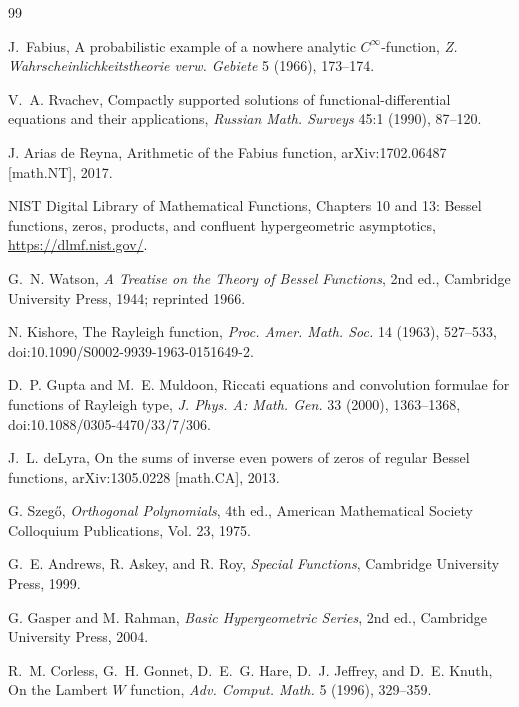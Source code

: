 \documentclass[11pt]{article}
\theoremstyle{definition}
\theoremstyle{remark}
\begin{document}
\begin{thebibliography}{99}

J.~Fabius,
\newblock A probabilistic example of a nowhere analytic \(C^\infty\)-function,
\newblock \emph{Z. Wahrscheinlichkeitstheorie verw. Gebiete} 5 (1966),
173--174.

V.~A. Rvachev,
\newblock Compactly supported solutions of functional-differential equations
and their applications,
\newblock \emph{Russian Math. Surveys} 45:1 (1990), 87--120.

J. Arias de Reyna,
\newblock Arithmetic of the Fabius function,
\newblock arXiv:1702.06487 [math.NT], 2017.

NIST Digital Library of Mathematical Functions,
\newblock Chapters 10 and 13: Bessel functions, zeros, products, and confluent
hypergeometric asymptotics,
\newblock \url{https://dlmf.nist.gov/}.

G.~N. Watson,
\newblock \emph{A Treatise on the Theory of Bessel Functions}, 2nd ed.,
\newblock Cambridge University Press, 1944; reprinted 1966.

N. Kishore,
\newblock The Rayleigh function,
\newblock \emph{Proc. Amer. Math. Soc.} 14 (1963), 527--533,
\newblock doi:10.1090/S0002-9939-1963-0151649-2.

D.~P. Gupta and M.~E. Muldoon,
\newblock Riccati equations and convolution formulae for functions of
Rayleigh type,
\newblock \emph{J. Phys. A: Math. Gen.} 33 (2000), 1363--1368,
\newblock doi:10.1088/0305-4470/33/7/306.

J.~L. deLyra,
\newblock On the sums of inverse even powers of zeros of regular Bessel
functions,
\newblock arXiv:1305.0228 [math.CA], 2013.

G. Szeg\H{o},
\newblock \emph{Orthogonal Polynomials}, 4th ed.,
\newblock American Mathematical Society Colloquium Publications, Vol. 23,
1975.

G.~E. Andrews, R. Askey, and R. Roy,
\newblock \emph{Special Functions},
\newblock Cambridge University Press, 1999.

G. Gasper and M. Rahman,
\newblock \emph{Basic Hypergeometric Series}, 2nd ed.,
\newblock Cambridge University Press, 2004.

R.~M. Corless, G.~H. Gonnet, D.~E.~G. Hare, D.~J. Jeffrey, and D.~E. Knuth,
\newblock On the Lambert \(W\) function,
\newblock \emph{Adv. Comput. Math.} 5 (1996), 329--359.


\end{thebibliography}
\end{document}
